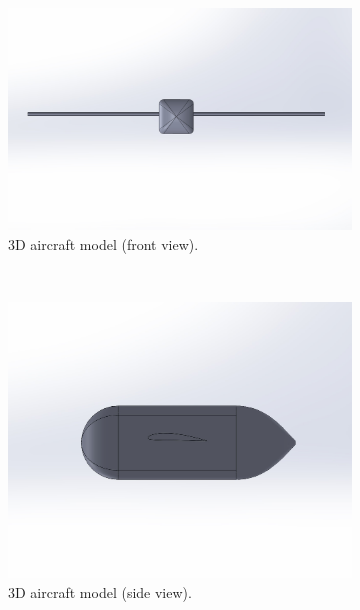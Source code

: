\begin{figure}[htpb]
    \centering
    \begin{subfigure}{0.5\textwidth}
        \centering
        \includegraphics[width=\textwidth]{Figures/Frontview9_29.jpg}
        \caption{3D aircraft model (front view).}
        \label{fig:3d_front}
    \end{subfigure}\\
    \begin{subfigure}{0.5\textwidth}
        \centering
        \includegraphics[width=\textwidth]{Figures/SideView9_29.jpg}
        \caption{3D aircraft model (side view).}
        \label{fig:3d_side}
    \end{subfigure} \\
    \begin{subfigure}{0.5\textwidth}

\end{subfigure}
\end{figure}
